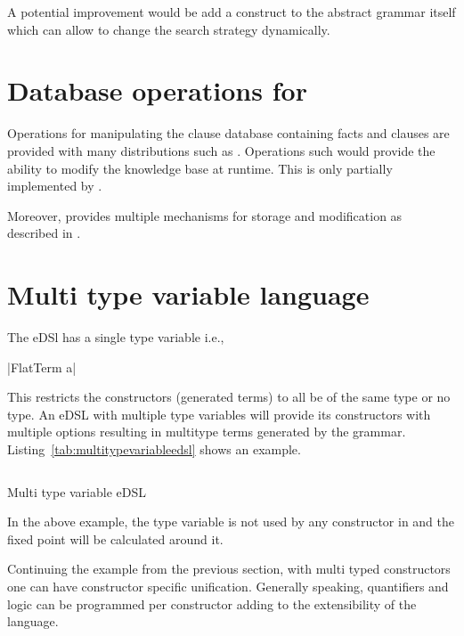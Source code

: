 \documentclass[thesis-solanki.tex]{subfiles}
\begin{document}
A potential improvement would be add a construct to the abstract grammar itself which can allow to change the
search strategy dynamically.

\section{Database operations for }
Operations for manipulating the clause database containing facts and clauses are provided with many
 distributions such as  \cite{website:swiprologdbops}.
Operations such  \cite{website:assertzswiprolog} would provide the ability to modify the
knowledge base at runtime.
This is only partially implemented by  \cite{prolog-lib}.

Moreover,  provides multiple mechanisms for storage and modification as described in
\cite{website:swiprologdbops}.

\section{Multi type variable language}
The eDSl  has a single type variable i.e.,

|FlatTerm a|

This restricts the constructors (generated terms) to all be of the same type or no type.
An eDSL with multiple type variables will provide its constructors with multiple options resulting in multitype
terms generated by the grammar.
Listing~\ref{tab:multitypevariableedsl} shows an example.

\begin{code-list}[H]
\begin{singlespace}
\inputminted{haskell}{haskell-proto4-multi-type-variable-edsl.hs}
\end{singlespace}
\caption{Multi type variable eDSL}
\label{tab:multitypevariableedsl}
\end{code-list}

In the above example, the  type variable is not used by any constructor in
 and the fixed point will be calculated around it.

Continuing the example from the previous section, with multi typed constructors one can have constructor specific
unification.
Generally speaking, quantifiers and logic can be programmed per constructor adding to the extensibility of the
language.
\end{document}
